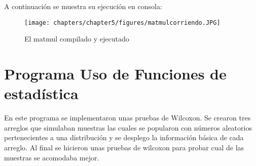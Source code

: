 \FloatBarrier
A continuación se muestra su ejecución en consola:
\begin{figure}[htbp]
    \centering
    \texttt{[image: chapters/chapter5/figures/matmulcorriendo.JPG]}
    \caption{El matmul compilado y ejecutado}
    \label{fig:my_label}
\end{figure}
\FloatBarrier
\section{Programa Uso de Funciones de estadística}

En este programa se implementaron unas pruebas de Wilcoxon. Se crearon tres arreglos que simulaban muestras las cuales se popularon con números aleatorios pertenecientes a una distribución y se desplego la información básica de cada arreglo. Al final se hicieron unas pruebas  de wilcoxon para probar cual de las muestras se acomodaba mejor.

